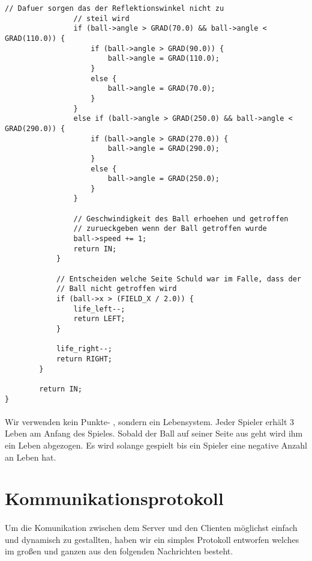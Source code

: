 \begin{lstlisting}[caption=Kernkomponeten der Spiellogik]
				// Dafuer sorgen das der Reflektionswinkel nicht zu
				// steil wird
				if (ball->angle > GRAD(70.0) && ball->angle < GRAD(110.0)) {
					if (ball->angle > GRAD(90.0)) {
						ball->angle = GRAD(110.0);
					}
					else {
						ball->angle = GRAD(70.0);
					}
				}
				else if (ball->angle > GRAD(250.0) && ball->angle < GRAD(290.0)) {
					if (ball->angle > GRAD(270.0)) {
						ball->angle = GRAD(290.0);
					}
					else {
						ball->angle = GRAD(250.0);
					}
				}

                // Geschwindigkeit des Ball erhoehen und getroffen
                // zurueckgeben wenn der Ball getroffen wurde
                ball->speed += 1;
                return IN;
            }
            
            // Entscheiden welche Seite Schuld war im Falle, dass der
            // Ball nicht getroffen wird
            if (ball->x > (FIELD_X / 2.0)) {
            	life_left--;
            	return LEFT;
            }

            life_right--;
            return RIGHT;
        }

        return IN;
}
\end{lstlisting}

\paragraph*{}
Wir verwenden kein Punkte- , sondern ein Lebensystem. Jeder Spieler erhält 3 Leben am Anfang des Spieles. Sobald der Ball auf seiner Seite aus geht wird ihm ein Leben abgezogen. Es wird solange gespielt bis ein Spieler eine negative Anzahl an Leben hat.  

\section*{Kommunikationsprotokoll}

\paragraph*{}
Um die Komunikation zwischen dem Server und den Clienten möglichst einfach und dynamisch zu gestallten, haben wir ein simples Protokoll entworfen welches im großen und ganzen aus den folgenden Nachrichten besteht.

\lstset{
	frame=none,
	}


